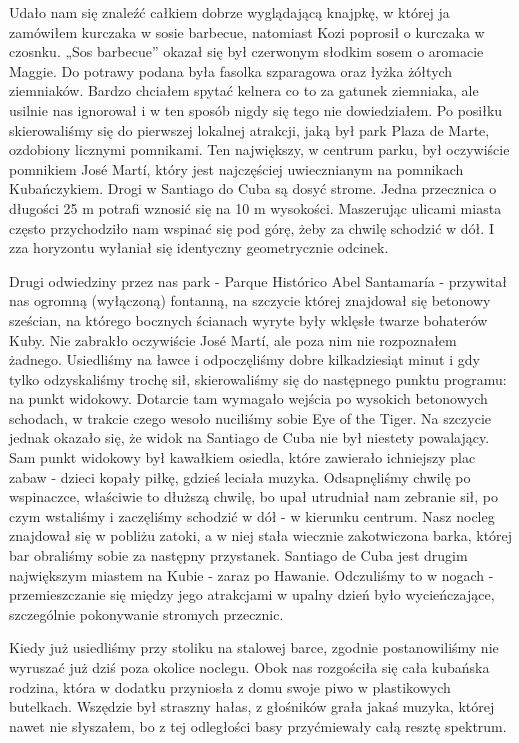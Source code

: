Udało nam się znaleźć całkiem dobrze wyglądającą knajpkę, w której ja zamówiłem kurczaka w sosie barbecue, natomiast Kozi poprosił o kurczaka w czosnku.
„Sos barbecue” okazał się był czerwonym słodkim sosem o aromacie Maggie.
Do potrawy podana była fasolka szparagowa oraz łyżka żółtych ziemniaków.
Bardzo chciałem spytać kelnera co to za gatunek ziemniaka, ale usilnie nas ignorował i w ten sposób nigdy się tego nie dowiedziałem.
Po posiłku skierowaliśmy się do pierwszej lokalnej atrakcji, jaką był park Plaza de Marte, ozdobiony licznymi pomnikami.
Ten największy, w centrum parku, był oczywiście pomnikiem José Martí, który jest najczęściej uwiecznianym na pomnikach Kubańczykiem.
Drogi w Santiago do Cuba są dosyć strome.
Jedna przecznica o długości 25 m potrafi wznosić się na 10 m wysokości. Maszerując ulicami miasta często przychodziło nam wspinać się pod górę, żeby za chwilę schodzić w dół. I zza horyzontu wyłaniał się identyczny geometrycznie odcinek.
\par Drugi odwiedziny przez nas park - Parque Histórico Abel Santamaría - przywitał nas ogromną (wyłączoną) fontanną, na szczycie której znajdował się betonowy sześcian, na którego bocznych ścianach wyryte były wklęsłe twarze bohaterów Kuby. Nie zabrakło oczywiście José Martí, ale poza nim nie rozpoznałem żadnego.
Usiedliśmy na ławce i odpoczęliśmy dobre kilkadziesiąt minut i gdy tylko odzyskaliśmy trochę sił, skierowaliśmy się do następnego punktu programu: na punkt widokowy.
Dotarcie tam wymagało wejścia po wysokich betonowych schodach, w trakcie czego wesoło nuciliśmy sobie Eye of the Tiger.
Na szczycie jednak okazało się, że widok na Santiago de Cuba nie był niestety powalający.
Sam punkt widokowy był kawałkiem osiedla, które zawierało ichniejszy plac zabaw - dzieci kopały piłkę, gdzieś leciała muzyka.
Odsapnęliśmy chwilę po wspinaczce, właściwie to dłuższą chwilę, bo upał utrudniał nam zebranie sił, po czym wstaliśmy i zaczęliśmy schodzić w dół - w kierunku centrum.
Nasz nocleg znajdował się w pobliżu zatoki, a w niej stała wiecznie zakotwiczona barka, której bar obraliśmy sobie za następny przystanek.
Santiago de Cuba jest drugim największym miastem na Kubie - zaraz po Hawanie. Odczuliśmy to w nogach - przemieszczanie się między jego atrakcjami w upalny dzień było wycieńczające, szczególnie pokonywanie stromych przecznic.
\par Kiedy już usiedliśmy przy stoliku na stalowej barce, zgodnie postanowiliśmy nie wyruszać już dziś poza okolice noclegu.
Obok nas rozgościła się cała kubańska rodzina, która w dodatku przyniosła z domu swoje piwo w plastikowych butelkach. Wszędzie był straszny hałas, z głośników grała jakaś muzyka, której nawet nie słyszałem, bo z tej odległości basy przyćmiewały całą resztę spektrum.
